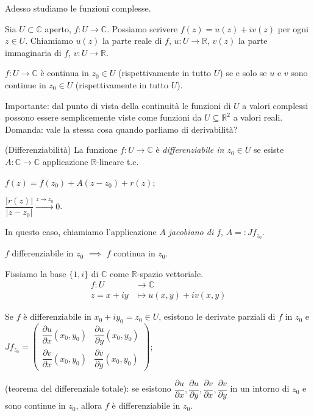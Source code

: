 Adesso studiamo le funzioni complesse.

Sia $U \subset \mathbb{C}$ aperto, $f:U \longrightarrow \mathbb{C}$. Possiamo scrivere $f(z)=u(z)+iv(z)$ per ogni $z \in U$. Chiamiamo $u(z)$ la parte reale di $f$, $u:U \longrightarrow \mathbb{R}$, $v(z)$ la parte immaginaria di $f$, $v:U \longrightarrow \mathbb{R}$.

\begin{ftt}
  $f:U \longrightarrow \mathbb{C}$ è continua in $z_0 \in U$ (rispettivamente in tutto $U$) se e solo se $u$ e $v$ sono continue in $z_0 \in U$ (rispettivamente in tutto $U$).
\end{ftt}

Importante: dal punto di vista della continuità le funzioni di $U$ a valori complessi possono essere semplicemente viste come funzioni da $U \subseteq \mathbb{R}^2$ a valori reali. Domanda: vale la stessa cosa quando parliamo di derivabilità?

\begin{defn}
  (Differenziabilità) La funzione $f:U \longrightarrow \mathbb{C}$ è \textit{differenziabile in $z_0 \in U$} se esiste $A:\mathbb{C} \longrightarrow \mathbb{C}$ applicazione $\mathbb{R}$-lineare t.c.
  \begin{nlist}
    \item $f(z)=f(z_0)+A(z-z_0)+r(z)$;
    \item $\dfrac{|r(z)|}{|z-z_0|} \xrightarrow[]{z \longrightarrow z_0} 0$.
  \end{nlist}
  In questo caso, chiamiamo l'applicazione $A$ \textit{jacobiano di $f$}, $A=: Jf_{z_0}$.
\end{defn}

\begin{oss}
  $f$ differenziabile in $z_0$ $\implies$ $f$ continua in $z_0$.
\end{oss}

Fissiamo la base $\{1, i\}$ di $\mathbb{C}$ come $\mathbb{R}$-spazio vettoriale.
\begin{align*}
  f:U &\longrightarrow \mathbb{C}\\
  z=x+iy &\longmapsto u(x, y)+iv(x, y)
\end{align*}

\begin{ftt}
  \begin{nlist}
    \item Se $f$ è differenziabile in $x_0+iy_0=z_0 \in U$, esistono le derivate parziali di $f$ in $z_0$ e $Jf_{z_0}=\begin{pmatrix}
      \dfrac{\partial u}{\partial x}(x_0, y_0) & \dfrac{\partial u}{\partial y}(x_0, y_0)\\
      \dfrac{\partial v}{\partial x}(x_0, y_0) & \dfrac{\partial v}{\partial y}(x_0, y_0)
  \end{pmatrix}$;
  \item (teorema del differenziale totale): se esistono $\dfrac{\partial u}{\partial x}, \dfrac{\partial u}{\partial y}, \dfrac{\partial v}{\partial x}, \dfrac{\partial v}{\partial y}$ in un intorno di $z_0$ e sono continue in $z_0$, allora $f$ è differenziabile in $z_0$.
  \end{nlist}
\end{ftt}

